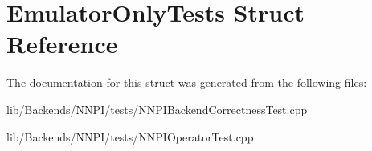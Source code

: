 \hypertarget{struct_emulator_only_tests}{}\section{Emulator\+Only\+Tests Struct Reference}
\label{struct_emulator_only_tests}


The documentation for this struct was generated from the following files\+:\begin{DoxyCompactItemize}
\item 
lib/\+Backends/\+N\+N\+P\+I/tests/N\+N\+P\+I\+Backend\+Correctness\+Test.\+cpp\item 
lib/\+Backends/\+N\+N\+P\+I/tests/N\+N\+P\+I\+Operator\+Test.\+cpp\end{DoxyCompactItemize}
